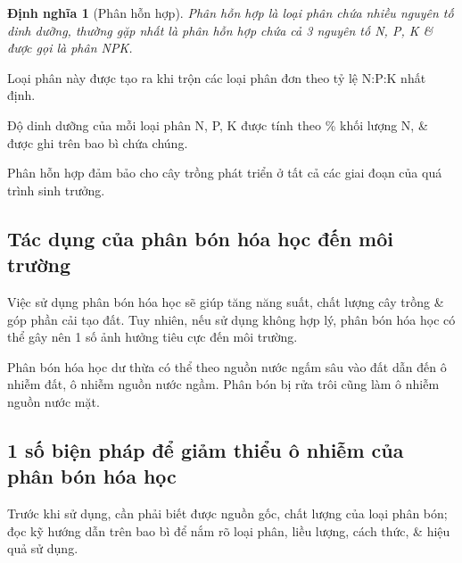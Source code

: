 \documentclass{article}
\newtheorem{dinhnghia}{Định nghĩa}
\begin{document}
\begin{dinhnghia}[Phân hỗn hợp]
	{\rm Phân hỗn hợp} là loại phân chứa nhiều nguyên tố dinh dưỡng, thường gặp nhất là phân hỗn hợp chứa cả 3 nguyên tố {\rm N, P, K} \& được gọi là {\rm phân NPK}.
\end{dinhnghia}
Loại phân này được tạo ra khi trộn các loại phân đơn theo tỷ lệ N:P:K nhất định.

Độ dinh dưỡng của mỗi loại phân N, P, K được tính theo \% khối lượng N,  \& được ghi trên bao bì chứa chúng.

Phân hỗn hợp đảm bảo cho cây trồng phát triển ở tất cả các giai đoạn của quá trình sinh trưởng.

\subsection{Tác dụng của phân bón hóa học đến môi trường}
Việc sử dụng phân bón hóa học sẽ giúp tăng năng suất, chất lượng cây trồng \& góp phần cải tạo đất. Tuy nhiên, nếu sử dụng không hợp lý, phân bón hóa học có thể gây nên 1 số ảnh hưởng tiêu cực đến môi trường.

Phân bón hóa học dư thừa có thể theo nguồn nước ngấm sâu vào đất dẫn đến ô nhiễm đất, ô nhiễm nguồn nước ngầm. Phân bón bị rửa trôi cũng làm ô nhiễm nguồn nước mặt.

\subsection{1 số biện pháp để giảm thiểu ô nhiễm của phân bón hóa học}
Trước khi sử dụng, cần phải biết được nguồn gốc, chất lượng của loại phân bón; đọc kỹ hướng dẫn trên bao bì để nắm rõ loại phân, liều lượng, cách thức, \& hiệu quả sử dụng.
\end{document}
